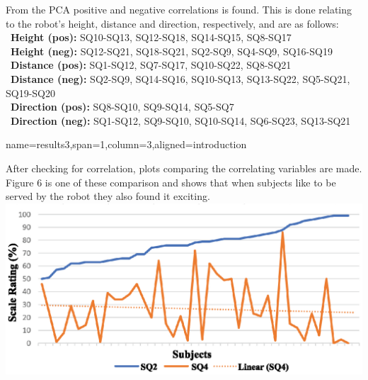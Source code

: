 \documentclass[paperwidth=118cm,paperheight=84cm,landscape,fontscale=0.2941]{baposter}
\begin{document}
\begin{poster}
{From the PCA positive and negative correlations is found. This is done relating to the robot's height, distance and direction, respectively, and are as follows:\\
\textbullet~\textbf{Height (pos):}  SQ10-SQ13, SQ12-SQ18, SQ14-SQ15, SQ8-SQ17\\
\textbullet~\textbf{Height (neg):} SQ12-SQ21, SQ18-SQ21, SQ2-SQ9, SQ4-SQ9, SQ16-SQ19\\
\textbullet~\textbf{Distance (pos):} SQ1-SQ12, SQ7-SQ17, SQ10-SQ22, SQ8-SQ21\\
\textbullet~\textbf{Distance (neg):} SQ2-SQ9, SQ14-SQ16, SQ10-SQ13, SQ13-SQ22, SQ5-SQ21, SQ19-SQ20\\
\textbullet~\textbf{Direction (pos):} SQ8-SQ10, SQ9-SQ14, SQ5-SQ7\\
\textbullet~\textbf{Direction (neg):} SQ1-SQ12, SQ9-SQ10, SQ10-SQ14, SQ6-SQ23, SQ13-SQ21

%





	


}


\headerbox{ }
{name=results3,span=1,column=3,aligned=introduction}
{\parskip 5pt
After checking for correlation, plots comparing the correlating variables are made. Figure 6 is one of these comparison and shows that when subjects like to be served by the robot they also found it exciting. 
\includegraphics[width=0.9\linewidth]{HeightSQ6_2.eps}

}
\end{poster}
\end{document}
